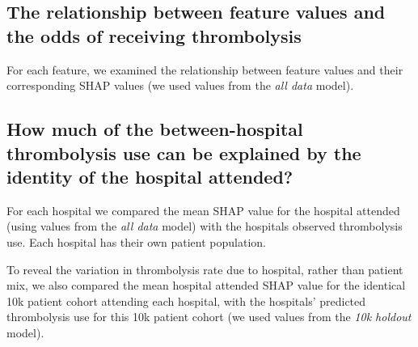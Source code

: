 


\subsection{The relationship between feature values and the odds of receiving thrombolysis}
For each feature, we examined the relationship between feature values and their corresponding SHAP values (we used values from the \emph{all data} model).

\subsection{How much of the between-hospital thrombolysis use can be explained by the identity of the hospital attended?}%

For each hospital we compared the mean SHAP value for the hospital attended (using values from the \emph{all data} model) with the hospitals observed thrombolysis use. Each hospital has their own patient population.

To reveal the variation in thrombolysis rate due to hospital, rather than patient mix, we also compared the mean hospital attended SHAP value for the identical 10k patient cohort attending each hospital, with the hospitals' predicted thrombolysis use for this 10k patient cohort (we used values from the \emph{10k holdout} model).


